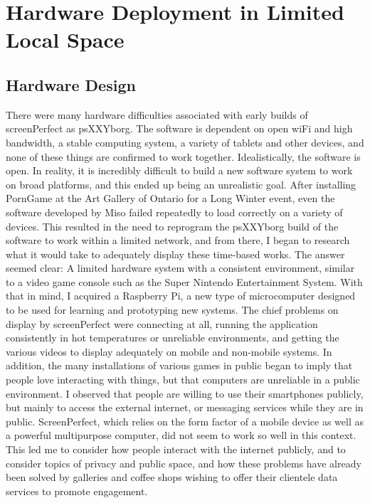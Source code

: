
\chapter{Hardware Deployment in Limited Local Space} %

\label{Chapter4} 


\section{Hardware Design}
There were many hardware difficulties associated with early builds of screenPerfect as psXXYborg. The software is dependent on open wiFi and high bandwidth, a stable computing system, a variety of tablets and other devices, and none of these things are confirmed to work together. Idealistically, the software is open. In reality, it is incredibly difficult to build a new software system to work on broad platforms, and this ended up being an unrealistic goal.
After installing PornGame at the Art Gallery of Ontario for a Long Winter event, even the software developed by Miso failed repeatedly to load correctly on a variety of devices. This resulted in the need to reprogram the psXXYborg build of the software to work within a limited network, and from there, I began to research what it would take to adequately display these time-based works. The answer seemed clear: A limited hardware system with a consistent environment, similar to a video game console such as the Super Nintendo Entertainment System. 
With that in mind, I acquired a Raspberry Pi, a new type of microcomputer designed to be used for learning and prototyping new systems. The chief problems on display by screenPerfect were connecting at all, running the application consistently in hot temperatures or unreliable environments, and getting the various videos to display adequately on mobile and non-mobile systems. In addition, the many installations of various games in public began to imply that people love interacting with things, but that computers are unreliable in a public environment. 
I observed that people are willing to use their smartphones publicly, but mainly to access the external internet, or messaging services while they are in public. ScreenPerfect, which relies on the form factor of a mobile device as well as a powerful multipurpose computer, did not seem to work so well in this context.
This led me to consider how people interact with the internet publicly, and to consider topics of privacy and public space, and how these problems have already been solved by galleries and coffee shops wishing to offer their clientele data services to promote engagement.
